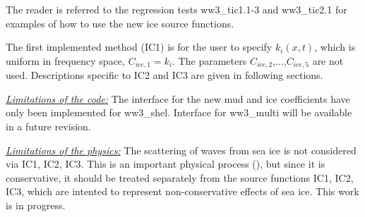 The reader is referred to the regression tests {\file ww3\_tic1.1-3} and
{\file ww3\_tic2.1} for examples of how to use the new ice source functions.

The first implemented method ({\code IC1}) is for the user to specify
${k_i(x,t)}$, which is uniform in frequency space, ${C_{ice,1}}={k_i}$. The
parameters ${C_{ice,2}}$,...,${C_{ice,5}}$ are not used. Descriptions specific
to IC2 and IC3 are given in following sections.

\textrm{\textit{\underline{Limitations of the code:}}} The interface for the
new mud and ice coefficients have only been implemented for {\file
ww3\_shel}. Interface for {\file ww3\_multi} will be available in a future
revision.  

\textrm{\textit{\underline{Limitations of the physics:}}} The
scattering of waves from sea ice is not considered via {\code IC1}, {\code
IC2}, {\code IC3}. This is an important physical process (\cite{art:Wad75}),
but since it is conservative, it should be treated separately from the source
functions {\code IC1}, {\code IC2}, {\code IC3}, which are intented to
represent non-conservative effects of sea ice. This work is in progress.
